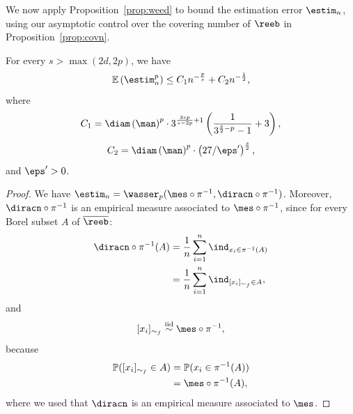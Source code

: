 We now apply Proposition~\ref{prop:weed} to bound the estimation error $\estim_n$, using our asymptotic control over the covering number of $\reeb$ in Proposition~\ref{prop:covn}.

 \begin{corollary}\label{cor:estim}
For every $s>\max(2d,2p)$, we have
 $$\mathbb{E}\left(\estim_n^p\right)\leq C_1n^{-\frac{p}{s}}+C_2n^{-\frac{1}{2}},$$
 where 
 $$C_1=\diam\left(\man\right)^p\cdot3^{\frac{3sp}{s-2p}+1}\left(\frac{1}{3^{\frac{s}{2}-p}-1}+3\right),$$
 $$C_2=\diam\left(\man\right)^p\cdot\left(27/\eps'\right)^{\frac{s}{2}},$$
 and $\eps'>0$.
 \end{corollary}
 \begin{proof}
 We have $\estim_n=\wasser_p(\mes\circ\pi^{-1},\diracn\circ\pi^{-1})$. Moreover, $\diracn\circ\pi^{-1}$ is an empirical measure associated to $\mes\circ\pi^{-1}$, since for every Borel subset $A$ of $\overline{\reeb}$:
 \begin{align*}
     \diracn\circ\pi^{-1}(A)&=\frac{1}{n}\sum_{i=1}^n\ind_{x_i\in\pi^{-1}(A)} \\
     &=\frac{1}{n}\sum_{i=1}^n\ind_{[x_i]_{\sim_f}\in A},
 \end{align*}
 and 
 $$[x_i]_{\sim_f}\overset{\mathrm{iid}}{\sim}\mes\circ\pi^{-1},$$
 because 
  \begin{align*}
     \mathbb{P}([x_i]_{\sim_f}\in A)&=\mathbb{P}(x_i\in \pi^{-1}(A)) \\
     &=\mes\circ\pi^{-1}(A),
 \end{align*}
 where we used that $\diracn$ is an empirical measure associated to $\mes$.
 

\end{proof}
